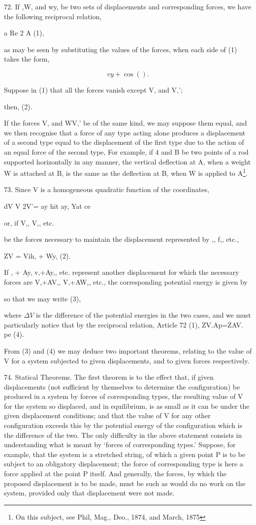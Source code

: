 72. If ,W, and wy, be two sets of displacements and corresponding forces, we
have the following reciprocal relation,

a Re 2 A (1),

as may be seen by substituting the values of the forces, when each side of (1)
takes the form,

\[vy + \cos().\]

Suppose in (1) that all the forces vanish except V, and V,';

then, (2).

If the forces V, and WV,' be of the same kind, we may suppose them equal, and
we then recognise that a force of any type acting alone produces a displacement
of a second type equal to the displacement of the first type due to the action
of an equal force of the second type, For example, if 4 and B be two points of
a rod supported horizontally in any manner, the vertical deflection at A, when
a weight W is attached at B, is the same as the deflection at B, when W is
applied to A\footnote{On this subject, see Phil, Mag., Deo., 1874, and March,
1875}.

73. Since V is a homogeneous quadratic function of the coordinates,

dV V 2V'= ay hit ay, Yat ce

or, if V,, V,, etc.

be the forces necessary to maintain the displacement represented by ,, f,,
etc.,

ZV = Vih, + Wy, (2).

If , + Ay, v,+Ay,, etc. represent another displacement for which the necessary
forces are V,+AV,, V,+AW,, etc., the corresponding potential energy is given by

so that we may write (3),

where \( \Delta V\) is the difference of the potential energies in the two
cases, and we must particularly notice that by the reciprocal relation, Article
72 (1), ZV.Ap=ZAV. pe (4).

From (3) and (4) we may deduce two important theorems, relating to the value of
V for a system subjected to given displacements, and to given forces
respectively.

74. Statical Theorems. The first theorem is to the effect that, if given
displacements (not sufficient by themselves to determine the configuration)
be produced in a system by forces of corresponding types, the resulting value of
V for the system so displaced, and in equilibrium, is as small as it can be
under the given displacement conditions; and that the value of V for any other
configuration exceeds this by the potential energy of the configuration which
is the difference of the two. The only difficulty in the above statement
consists in understanding what is meant by `forces of corresponding types.'
Suppose, for example, that the system is a stretched string, of which a given
point P is to be subject to an obligatory displacement; the force of
corresponding type is here a force applied at the point P itself. And
generally, the forces, by which the proposed displacement is to be made, must
be such as would do no work on the system, provided only that displacement were
not made.

